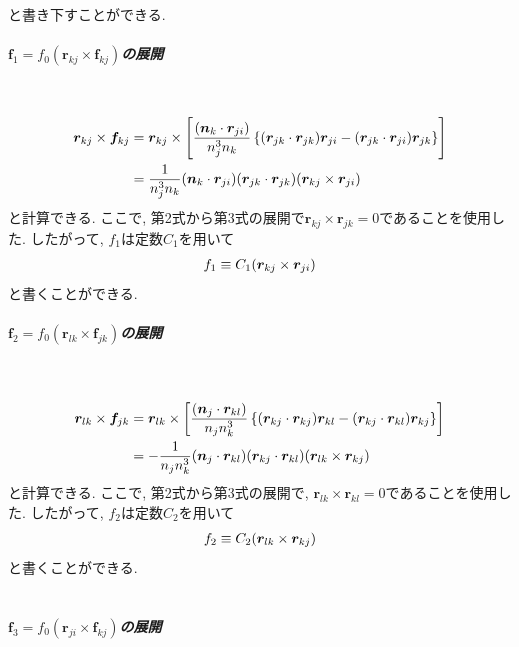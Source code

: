 と書き下すことができる. 
\\
\subparagraph{$\bm{f}_{1} = f_{0} (\bm{r}_{kj} \times \bm{f}_{kj})$の展開} \
\begin{align}
    \bm{r}_{kj} \times \bm{f}_{kj}
 &=
    \bm{r}_{kj} \times
    \left[
          \frac{(\bm{n}_{k} \cdot \bm{r}_{ji})}{n_{j}^{3}n_{k}}
          \left\{
                  (\bm{r}_{jk} \cdot \bm{r}_{jk}) \bm{r}_{ji}
                 -(\bm{r}_{jk} \cdot \bm{r}_{ji}) \bm{r}_{jk}
          \right\}
    \right]
 \notag
 \\
 &=
    \frac{1}{n_{j}^{3}n_{k}}
    (\bm{n}_{k} \cdot \bm{r}_{ji})
    (\bm{r}_{jk} \cdot \bm{r}_{jk})
    (\bm{r}_{kj} \times \bm{r}_{ji})
 \notag
\end{align}
と計算できる.
ここで, 第2式から第3式の展開で$\bm{r}_{kj} \times \bm{r}_{jk} = 0$であることを使用した.
したがって, $f_{1}$は定数$C_{1}$を用いて
\begin{align}
 f_{1} \equiv C_{1} (\bm{r}_{kj} \times \bm{r}_{ji})
 \notag
\end{align}
と書くことができる. 
\\

\subparagraph{$\bm{f}_{2} = f_{0} (\bm{r}_{lk} \times \bm{f}_{jk})$の展開} \

\begin{align}
    \bm{r}_{lk} \times \bm{f}_{jk}
 &=
    \bm{r}_{lk} \times
    \left[
          \frac{(\bm{n}_{j} \cdot \bm{r}_{kl})}{n_{j}n_{k}^{3}}
          \left\{
                  (\bm{r}_{kj} \cdot \bm{r}_{kj}) \bm{r}_{kl}
                 -(\bm{r}_{kj} \cdot \bm{r}_{kl}) \bm{r}_{kj}
          \right\}
    \right]
 \notag
 \\
 &=
    - \frac{1}{n_{j}n_{k}^{3}}
    (\bm{n}_{j} \cdot \bm{r}_{kl})
    (\bm{r}_{kj} \cdot \bm{r}_{kl})
    (\bm{r}_{lk} \times \bm{r}_{kj})
 \notag
\end{align}
と計算できる. ここで, 第2式から第3式の展開で, $\bm{r}_{lk} \times \bm{r}_{kl} = 0$であることを使用した. 
したがって, $f_{2}$は定数$C_{2}$を用いて
\begin{align}
 f_{2} \equiv C_{2} (\bm{r}_{lk} \times \bm{r}_{kj})
 \notag
\end{align}
と書くことができる. 
\\
\\

\subparagraph{$\bm{f}_{3} = f_{0} (\bm{r}_{ji} \times \bm{f}_{kj})$の展開} \

